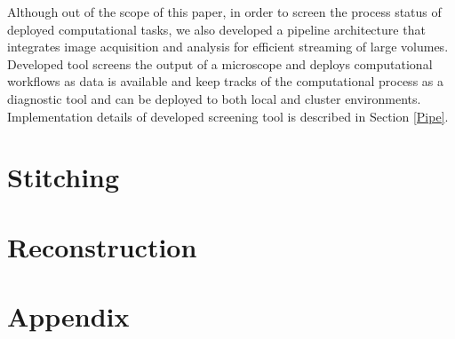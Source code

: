 \documentclass{article}
\begin{document}
Although out of the scope of this paper, in order to screen the process status of deployed computational tasks, we also developed a pipeline architecture that integrates image acquisition and analysis for efficient streaming of large volumes. Developed tool screens the output of a microscope and deploys computational workflows as data is available and keep tracks of the computational process as a diagnostic tool and can be deployed to both local and cluster environments. Implementation details of developed screening tool is described in Section \ref{Pipe}.

\section{Stitching}
\label{stitching}


\section{Reconstruction}
\label{recon}


\section{Appendix}


% 
\printbibliography[
heading=bibintoc,
title={Whole bibliography}
] %

\clearpage

\printbibliography[heading=subbibintoc,type=article,title={Articles only}]
\printbibliography[type=book,title={Books only}]

\printbibliography[keyword={physics},title={Physics-related only}]
\printbibliography[keyword={latex},title={\LaTeX-related only}]
\end{document}
